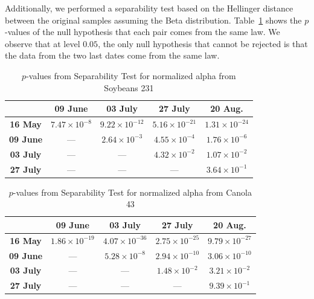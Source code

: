 \documentclass[journal]{IEEEtran}
\begin{document}
Additionally, we performed a separability test based on the Hellinger distance between the original samples assuming the Beta distribution.
Table~\ref{tab:pvalues_sep_alpha_sb231} shows the $p$-values of the null hypothesis that each pair comes from the same law.
We observe that at level $0.05$, the only null hypothesis that cannot be rejected is that the data from the two last dates come from the same law.

\begin{table}[hbt]
  \footnotesize
  \centering
  \caption{$p$-values from Separability Test for normalized alpha from Soybeans 231}
  \label{tab:pvalues_sep_alpha_sb231}
  \begin{tabular}{ccccc}
  \toprule
& \textbf{09 June} & \textbf{03 July} & \textbf{27 July} & \textbf{20 Aug.}\\ \midrule
  \textbf{16 May}  & $7.47 \times 10^{-8}$ & $9.22 \times 10^{-12}$ & $5.16 \times 10^{-21}$ & $1.31 \times 10^{-24}$ \\
  \textbf{09 June}  & --- & $2.64 \times 10^{-3}$ & $4.55 \times 10^{-4}$ & $1.76 \times 10^{-6}$ \\
  \textbf{03 July}  & --- & --- & $4.32 \times 10^{-2}$ & $1.07 \times 10^{-2}$\\
  \textbf{27 July}  & --- & --- & --- & $3.64 \times 10^{-1}$ \\
  \bottomrule
  \end{tabular}
\end{table}

\begin{table}[hbt]
  \footnotesize
  \centering
  \caption{$p$-values from Separability Test for normalized alpha from Canola 43}
  \label{tab:pvalues_sep_alpha_cn43}
  \begin{tabular}{ccccc}
  \toprule
  & \textbf{09 June} & \textbf{03 July} & \textbf{27 July} & \textbf{20 Aug.}\\ \midrule
  \textbf{16 May}  & $1.86 \times 10^{-19}$ & $4.07 \times 10^{-36}$ & $2.75 \times 10^{-25}$ & $9.79 \times 10^{-27}$ \\
  \textbf{09 June}  & --- & $5.28 \times 10^{-8}$ & $2.94 \times 10^{-10}$ & $3.06 \times 10^{-10}$ \\
  \textbf{03 July}  & --- & --- & $1.48 \times 10^{-2}$ & $3.21 \times 10^{-2}$\\
  \textbf{27 July}  & --- & --- & --- & $9.39 \times 10^{-1}$ \\
  \bottomrule
  \end{tabular}
\end{table}
\end{document}
